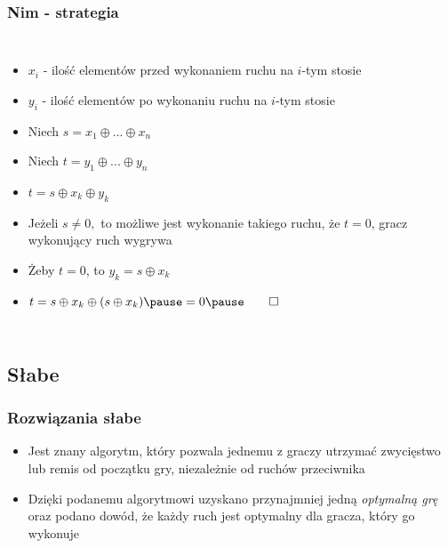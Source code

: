 \documentclass[polish,envcountsect,10pt]{beamer}
\begin{document}
                \begin{frame}
                    \frametitle{Nim - strategia}
                    \begin{columns}
                            \begin{itemize}
                                \item<1-> $x_i$ - ilość elementów przed wykonaniem ruchu na $i$-tym stosie
                                \item<1-> $y_i$ - ilość elementów po wykonaniu ruchu na $i$-tym stosie
                                \item<1-> Niech $s = x_1 \oplus ... \oplus x_n$
                                \item<1-> Niech $t = y_1 \oplus ... \oplus y_n$
                                \item<1-> $t = s \oplus x_k \oplus y_k$
                                \item<2-> Jeżeli $s \neq 0,$ to możliwe jest wykonanie takiego ruchu, że $t = 0$, gracz wykonujący ruch wygrywa
                                \item<4-> Żeby $t = 0$, to $y_k = s \oplus x_k$
                                \item<5-> $t = s \oplus x_k \oplus (s \oplus x_k) \pause = 0 \pause \qed$
                            \end{itemize}
                \end{columns}
                \end{frame}
            \subsection{Słabe}
            \begin{frame}
                \frametitle{Rozwiązania słabe}
                \begin{itemize}
                    \item<1-> Jest znany algorytm, który pozwala jednemu z graczy utrzymać zwycięstwo lub remis od początku gry, niezależnie od ruchów przeciwnika
                    \item<2-> Dzięki podanemu algorytmowi uzyskano przynajmniej jedną \textit{optymalną grę} oraz podano dowód, że każdy ruch jest optymalny dla gracza, który go wykonuje                    
                \end{itemize}     
            \end{frame}
\end{document}
